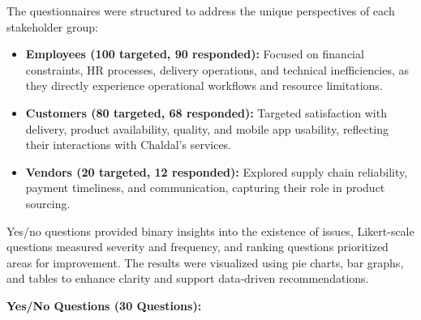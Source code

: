 \documentclass[12pt,a4paper]{article}
\begin{document}
The questionnaires were structured to address the unique perspectives of each stakeholder group:
\begin{itemize}
    \item \textbf{Employees (100 targeted, 90 responded):} Focused on financial constraints, HR processes, delivery operations, and technical inefficiencies, as they directly experience operational workflows and resource limitations.
    \item \textbf{Customers (80 targeted, 68 responded):} Targeted satisfaction with delivery, product availability, quality, and mobile app usability, reflecting their interactions with Chaldal’s services.
    \item \textbf{Vendors (20 targeted, 12 responded):} Explored supply chain reliability, payment timeliness, and communication, capturing their role in product sourcing.
\end{itemize}
Yes/no questions provided binary insights into the existence of issues, Likert-scale questions measured severity and frequency, and ranking questions prioritized areas for improvement. The results were visualized using pie charts, bar graphs, and tables to enhance clarity and support data-driven recommendations.

\textbf{Yes/No Questions (30 Questions):}
\end{document}
